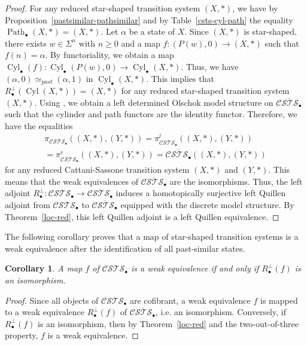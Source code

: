 \documentclass[a4paper,12pt]{amsart}
\newtheorem{cor}[thm]{Corollary}
\begin{document}
\begin{proof} For any reduced star-shaped transition system $(X,*)$, we have by
Proposition~\ref{pastsimilar-pathsimilar} and by
Table~\ref{csts-cyl-path} the equality
$\operatorname{{Path}}_\bullet(X,*)=(X,*)$. Let $\alpha$ be a state of $X$. Since
$(X,*)$ is star-shaped, there exists $w\in \Sigma^n$ with $n{\geqslant} 0$
and a map $f:(P(w),0) \to (X,*)$ such that $f(n)=\alpha$. By
functoriality, we obtain a map $\operatorname{{Cyl}}_\bullet(f):\operatorname{{Cyl}}_\bullet(P(w),0)
\to \operatorname{{Cyl}}_\bullet(X,*)$. Thus, we have $(\alpha,0) \simeq_{past}
(\alpha,1)$ in $\operatorname{{Cyl}}_\bullet(X,*)$. This implies that
$R_\bullet^\perp(\operatorname{{Cyl}}(X,*))=(X,*)$ for any reduced star-shaped
transition system $(X,*)$. Using \cite[Theorem~3.1]{leftdet}, we
obtain a left determined Olschok model structure on
$\overline{{\mathcal{C\!S\!T\!S}}_\bullet}$ such that the cylinder and path functors
are the identity functor.  Therefore, we have the equalities
\begin{multline*}\pi_{\overline{{\mathcal{C\!S\!T\!S}}_\bullet}}((X,*),(Y,*)) =
  \pi^l_{\overline{{\mathcal{C\!S\!T\!S}}_\bullet}}((X,*),(Y,*))\\ =
  \pi^r_{\overline{{\mathcal{C\!S\!T\!S}}_\bullet}}((X,*),(Y,*)) =
  \overline{{\mathcal{C\!S\!T\!S}}_\bullet}((X,*),(Y,*))\end{multline*} for any reduced
Cattani-Sassone transition system $(X,*)$ and $(Y,*)$. This means that
the weak equivalences of $\overline{{\mathcal{C\!S\!T\!S}}_\bullet}$ are the
isomorphisms.  Thus, the left adjoint $R_\bullet^\perp:{\mathcal{C\!S\!T\!S}}_\bullet
\to \overline{{\mathcal{C\!S\!T\!S}}_\bullet}$ induces a homotopically surjective left
Quillen adjoint from ${\mathcal{C\!S\!T\!S}}_\bullet$ to $\overline{{\mathcal{C\!S\!T\!S}}_\bullet}$
equipped with the discrete model structure.  By Theorem~\ref{loc-red},
this left Quillen adjoint is a left Quillen equivalence.  \end{proof}

The following corollary proves that a map of star-shaped transition
systems is a weak equivalence after the identification of all
past-similar states.

\begin{cor} \label{red-2} A map $f$ of ${\mathcal{C\!S\!T\!S}}_\bullet$ is a weak
  equivalence if and only if $R_\bullet^\perp(f)$ is an
  isomorphism. \end{cor}

\begin{proof} Since all objects of ${\mathcal{C\!S\!T\!S}}_\bullet$ are cofibrant, a weak
equivalence $f$ is mapped to a weak equivalence $R_\bullet^\perp(f)$
of $\overline{{\mathcal{C\!S\!T\!S}}_\bullet}$, i.e. an isomorphism.  Conversely, if
$R_\bullet^\perp(f)$ is an isomorphism, then by Theorem~\ref{loc-red}
and the two-out-of-three property, $f$ is a weak equivalence.
\end{proof} 
\end{document}
